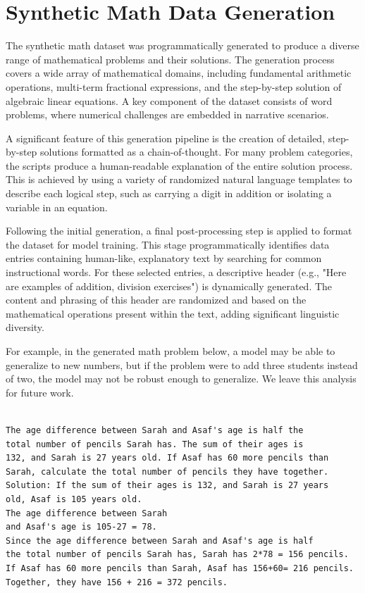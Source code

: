 \section{Synthetic Math Data Generation}
\label{app:mwp}
The synthetic math dataset was programmatically generated to produce a diverse range of mathematical problems and their solutions. The generation process covers a wide array of mathematical domains, including fundamental arithmetic operations, multi-term fractional expressions, and the step-by-step solution of algebraic linear equations. A key component of the dataset consists of word problems, where numerical challenges are embedded in narrative scenarios.

A significant feature of this generation pipeline is the creation of detailed, step-by-step solutions formatted as a chain-of-thought. For many problem categories, the scripts produce a human-readable explanation of the entire solution process. This is achieved by using a variety of randomized natural language templates to describe each logical step, such as carrying a digit in addition or isolating a variable in an equation.

Following the initial generation, a final post-processing step is applied to format the dataset for model training. This stage programmatically identifies data entries containing human-like, explanatory text by searching for common instructional words. For these selected entries, a descriptive header (e.g., "Here are examples of addition, division exercises") is dynamically generated. The content and phrasing of this header are randomized and based on the mathematical operations present within the text, adding significant linguistic diversity.


For example, in the generated math problem below, a model may be able to generalize to new numbers, but if the problem were to add three students instead of two, the model may not be robust enough to generalize. We leave this analysis for future work.

\begin{verbatim}

The age difference between Sarah and Asaf's age is half the 
total number of pencils Sarah has. The sum of their ages is 
132, and Sarah is 27 years old. If Asaf has 60 more pencils than 
Sarah, calculate the total number of pencils they have together.
Solution: If the sum of their ages is 132, and Sarah is 27 years 
old, Asaf is 105 years old.
The age difference between Sarah 
and Asaf's age is 105-27 = 78.
Since the age difference between Sarah and Asaf's age is half 
the total number of pencils Sarah has, Sarah has 2*78 = 156 pencils.
If Asaf has 60 more pencils than Sarah, Asaf has 156+60= 216 pencils.
Together, they have 156 + 216 = 372 pencils.
\end{verbatim}

